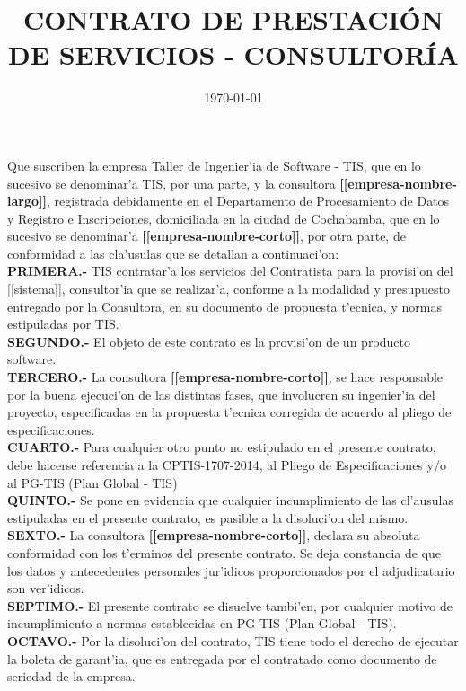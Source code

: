 \documentclass{article}
\newcommand{\sistema}[0]{[[sistema]]}
\newcommand{\convocatoria}[0]{CPTIS-1707-2014}
\newcommand{\empresa}[0]{\textbf{[[empresa-nombre-corto]]}}
\newcommand{\empresaL}[0]{\textbf{[[empresa-nombre-largo]]}}
\begin{document}
\title{\bf{CONTRATO DE PRESTACI\'ON DE SERVICIOS - CONSULTOR\'IA}}
\date{\today}

\maketitle

Que suscriben la empresa Taller de Ingenier'ia de Software - TIS, que en lo sucesivo se denominar'a TIS, por una parte, y la consultora  \empresaL, registrada debidamente en el Departamento de Procesamiento de Datos y Registro e Inscripciones, domiciliada en la ciudad de Cochabamba, que en lo sucesivo se denominar'a \empresa, por otra parte, de conformidad a las cla'usulas que se detallan a continuaci'on:
\\
{\bf{PRIMERA.-}} TIS contratar'a los servicios del Contratista para la provisi'on del \sistema, consultor'ia que se realizar'a, conforme a la modalidad y  presupuesto entregado por la Consultora, en su documento de propuesta t'ecnica, y normas estipuladas por TIS.
\\
{\bf{SEGUNDO.-}} El objeto de este contrato  es la provisi'on de un producto software.
\\
{\bf{TERCERO.-}} La consultora \empresa,  se hace responsable por la buena ejecuci'on de las distintas fases, que involucren su ingenier'ia del proyecto, especificadas en la propuesta t'ecnica corregida de acuerdo al pliego de especificaciones.
\\
{\bf{CUARTO.-}} Para cualquier otro punto no estipulado en el presente contrato, debe hacerse referencia a la \convocatoria, al Pliego de Especificaciones y/o al PG-TIS (Plan Global - TIS)
\\
{\bf{QUINTO.-}} Se pone en evidencia que cualquier incumplimiento de las cl'ausulas estipuladas en el presente contrato, es pasible a la disoluci'on del mismo.
\\
{\bf{SEXTO.-}} La consultora \empresa,  declara su absoluta conformidad con los t'erminos del presente contrato. Se deja constancia de que los datos y antecedentes personales jur'idicos proporcionados por el adjudicatario son ver'idicos.
\\
{\bf{SEPTIMO.-}} El presente contrato se disuelve tambi'en, por cualquier motivo de incumplimiento a normas establecidas en PG-TIS (Plan Global - TIS).
\\
{\bf{OCTAVO.-}} Por la disoluci'on del contrato, TIS tiene todo el derecho de ejecutar la boleta de garant'ia, que es entregada por el contratado como documento de seriedad de la empresa.
\end{document}
